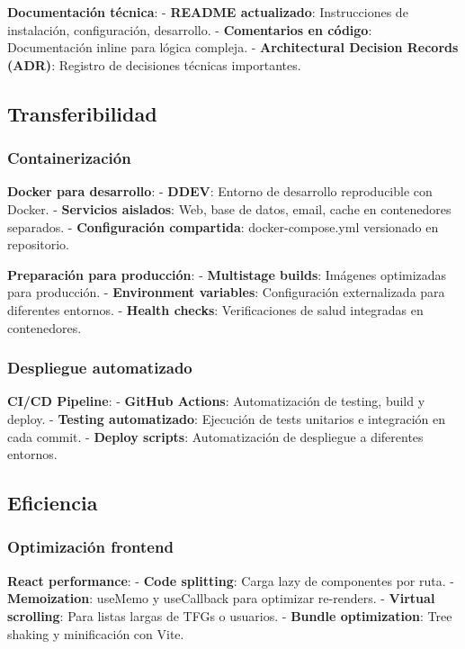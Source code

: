 \documentclass[12pt,a4paper,oneside]{report}
\begin{document}
\textbf{Documentación técnica}: - \textbf{README actualizado}:
Instrucciones de instalación, configuración, desarrollo. -
\textbf{Comentarios en código}: Documentación inline para lógica
compleja. - \textbf{Architectural Decision Records (ADR)}: Registro de
decisiones técnicas importantes.

\subsection{Transferibilidad}\label{transferibilidad}

\subsubsection{Containerización}\label{containerizaciuxf3n}

\textbf{Docker para desarrollo}: - \textbf{DDEV}: Entorno de desarrollo
reproducible con Docker. - \textbf{Servicios aislados}: Web, base de
datos, email, cache en contenedores separados. - \textbf{Configuración
compartida}: docker-compose.yml versionado en repositorio.

\textbf{Preparación para producción}: - \textbf{Multistage builds}:
Imágenes optimizadas para producción. - \textbf{Environment variables}:
Configuración externalizada para diferentes entornos. - \textbf{Health
checks}: Verificaciones de salud integradas en contenedores.

\subsubsection{Despliegue automatizado}\label{despliegue-automatizado}

\textbf{CI/CD Pipeline}: - \textbf{GitHub Actions}: Automatización de
testing, build y deploy. - \textbf{Testing automatizado}: Ejecución de
tests unitarios e integración en cada commit. - \textbf{Deploy scripts}:
Automatización de despliegue a diferentes entornos.

\subsection{Eficiencia}\label{eficiencia}

\subsubsection{Optimización frontend}\label{optimizaciuxf3n-frontend}

\textbf{React performance}: - \textbf{Code splitting}: Carga lazy de
componentes por ruta. - \textbf{Memoization}: useMemo y useCallback para
optimizar re-renders. - \textbf{Virtual scrolling}: Para listas largas
de TFGs o usuarios. - \textbf{Bundle optimization}: Tree shaking y
minificación con Vite.
\end{document}
